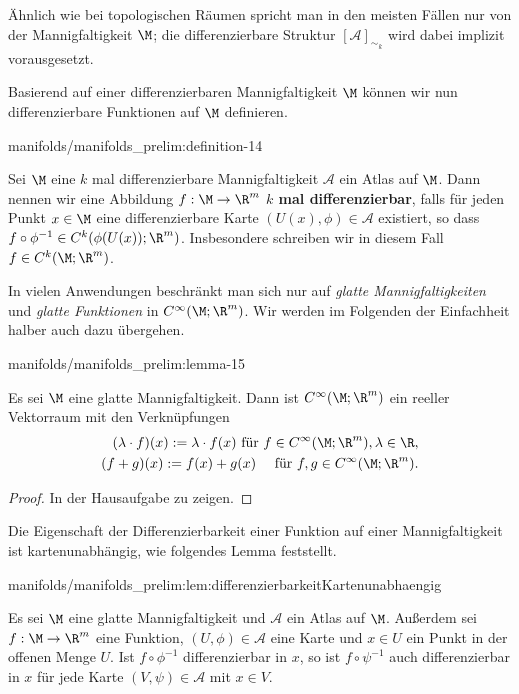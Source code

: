 \documentclass[letterpaper,10pt,german]{jupyterBook}
\begin{document}
\par
Ähnlich wie bei topologischen Räumen spricht man in den meisten Fällen nur von der Mannigfaltigkeit \(\M\); die differenzierbare Struktur \([\mathcal{A}]_{\sim_k}\) wird dabei implizit vorausgesetzt.

\par
Basierend auf einer differenzierbaren Mannigfaltigkeit \(\M\) können wir nun differenzierbare Funktionen auf \(\M\) definieren.
\begin{definition}{}{manifolds/manifolds_prelim:definition-14}



\par
Sei \(\M\) eine \(k\) mal differenzierbare Mannigfaltigkeit \(\mathcal{A}\) ein Atlas auf \(\M\).
Dann nennen wir eine Abbildung \(f:\M\to\R^m\) \textbf{\(k\) mal differenzierbar}, falls für jeden Punkt \(x\in\M\) eine differenzierbare Karte \((U(x),\phi)\in\mathcal{A}\) existiert, so dass \(f\circ\phi^{-1} \in C^k(\phi(U(x)); \R^m)\).
Insbesondere schreiben wir in diesem Fall \(f\in C^k(\M; \R^m)\).
\end{definition}

\par
In vielen Anwendungen beschränkt man sich nur auf \emph{glatte Mannigfaltigkeiten} und \emph{glatte Funktionen} in \(C^\infty(\M; \R^m)\).
Wir werden im Folgenden der Einfachheit halber auch dazu übergehen.
\begin{lemma}{}{manifolds/manifolds_prelim:lemma-15}



\par
Es sei \(\M\) eine glatte Mannigfaltigkeit.
Dann ist \(C^\infty(\M; \R^m)\) ein reeller Vektorraum mit den Verknüpfungen
\begin{align*}
(\lambda \cdot f)(x) := \lambda\cdot f(x)\text{ für } f\in C^\infty(\M; \R^m), \lambda\in\R,\\
(f + g)(x) := f(x) + g(x)\quad\text{ für } f,g\in C^\infty(\M; \R^m).
\end{align*}\end{lemma}

\begin{proof}
 In der Hausaufgabe zu zeigen.
\end{proof}

\par
Die Eigenschaft der Differenzierbarkeit einer Funktion auf einer Mannigfaltigkeit ist kartenunabhängig, wie folgendes Lemma feststellt.
\begin{lemma}{}{manifolds/manifolds_prelim:lem:differenzierbarkeitKartenunabhaengig}



\par
Es sei \(\M\) eine glatte Mannigfaltigkeit und \(\mathcal{A}\) ein Atlas auf \(\M\).
Außerdem sei \(f:\M \to \R^m\) eine Funktion, \((U,\phi)\in \mathcal{A}\) eine Karte und \(x \in U\) ein Punkt in der offenen Menge \(U\).
Ist \(f\circ\phi^{-1}\) differenzierbar in \(x\), so ist \(f\circ\psi^{-1}\) auch differenzierbar in \(x\) für jede Karte \((V,\psi) \in \mathcal{A}\) mit \(x\in V\).
\end{lemma}
\end{document}
